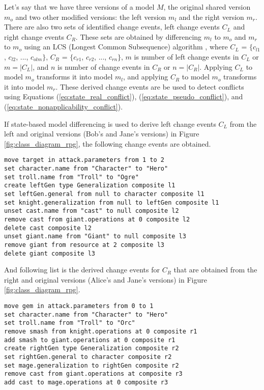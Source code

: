 Let's say that we have three versions of a model $M$, the original shared version $m_{o}$ and two other modified versions: the left version $m_{l}$ and the right version $m_{r}$. There are also two sets of identified change events, left change events $C_{L}$ and right change events $C_{R}$. These sets are obtained by differencing $m_{l}$ to $m_{o}$ and $m_{r}$ to $m_{o}$ using an LCS (Longest Common Subsequence) algorithm \cite{emfcompare2018developer,DBLP:journals/algorithmica/Meyers86}, where $C_{L}$ = $\{c_{l1}$, $c_{l2}$, ..., $c_{olm}\}$, $C_{R}$ = $\{c_{r1}$, $c_{r2}$, ..., $c_{rn}\}$, $m$ is number of left change events in $C_{L}$ or $m = |C_{L}|$, and $n$ is number of change events in $C_{R}$ or $n = |C_{R}|$. Applying $C_{L}$ to model $m_{o}$ transforms it into model $m_{l}$, and applying $C_{R}$ to model $m_{o}$ transforms it into model $m_{r}$. These derived change events are be used to detect conflicts using Equations (\ref{eq:state_real_conflict}), (\ref{eq:state_pseudo_conflict}), and (\ref{eq:state_nonapplicability_conflict}).  

If state-based model differencing is used to derive left change events $C_{L}$ from the left and original versions (Bob's and Jane's versions) in Figure \ref{fig:class_diagram_rpg}, the following change events are obtained. 
\begin{lstlisting}[firstnumber=1,style=eol,caption={The derived, minimal change events to produce the left version (Bob's version) in Figure \ref{fig:class_diagram_left} from the original version (Jane's version).},label=lst:cbp_left_state]
move target in attack.parameters from 1 to 2
set character.name from "Character" to "Hero"
set troll.name from "Troll" to "Ogre"
create leftGen type Generalization composite l1
set leftGen.general from null to character composite l1
set knight.generalization from null to leftGen composite l1
unset cast.name from "cast" to null composite l2
remove cast from giant.operations at 0 composite l2
delete cast composite l2
unset giant.name from "Giant" to null composite l3
remove giant from resource at 2 composite l3
delete giant composite l3
\end{lstlisting}

And following list is the derived change events for $C_{R}$ that are obtained from the right and original versions (Alice's and Jane's versions) in Figure \ref{fig:class_diagram_rpg}. 
\begin{lstlisting}[firstnumber=1,style=eol,caption={The derived, minimal change events to produce the right version (Alice's version) in Figure \ref{fig:class_diagram_right} from the original version (Jane's version).},label=lst:cbp_right_state]
move gem in attack.parameters from 0 to 1
set character.name from "Character" to "Hero"
set troll.name from "Troll" to "Orc"
remove smash from knight.operations at 0 composite r1
add smash to giant.operations at 0 composite r1
create rightGen type Generalization composite r2
set rightGen.general to character composite r2
set mage.generalization to rightGen composite r2
remove cast from giant.operations at composite r3
add cast to mage.operations at 0 composite r3
\end{lstlisting}


